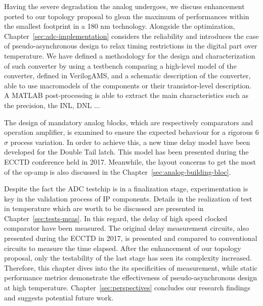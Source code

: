 Having the severe degradation the analog undergoes, we discuss enhancement ported to our topology proposal to glean the maximum of performances within the smallest footprint in a 180 nm technology. Alongside the optimization, Chapter~\ref{sec:adc-implementation} considers the reliability and introduces the case of pseudo-asynchronous design to relax timing restrictions in the digital part over temperature. We have defined a methodology for the design and characterization of such converter by using a testbench comparing a high-level model of the converter, defined in VerilogAMS, and a schematic description of the converter, able to use macromodels of the components or their transistor-level description. A MATLAB post-processing is able to extract the main characteristics such as the precision, the INL, DNL ...

The design of mandatory analog blocks, which are respectively comparators and operation amplifier, is examined to ensure the expected behaviour for a rigorous 6\(\sigma\) process variation. In order to achieve this, a new time delay model have been developed for the Double Tail latch. This model has been presented during the ECCTD conference held in 2017. Meanwhile, the layout concerns to get the most of the op-amp is also discussed in the Chapter~\ref{sec:analog-building-bloc}.

Despite the fact the ADC testchip is in a finalization stage, experimentation is key in the validation process of IP components. Details in the realization of test in temperature which are worth to be discussed are presented in Chapter~\ref{sec:tests-meas}. In this regard, the delay of high speed clocked comparator have been measured. The original delay measurement circuits, also presented during the ECCTD in 2017, is presented and compared to conventional circuits to measure the time elapsed. After the enhancement of our topology proposal, only the testability of the last stage has seen its complexity increased. Therefore, this chapter dives into the its specificities of measurement, while static performance metrics demonstrate the effectiveness of pseudo-asynchronous design at high temperature. Chapter~\ref{sec:perspectives} concludes our research findings and suggests potential future work.
